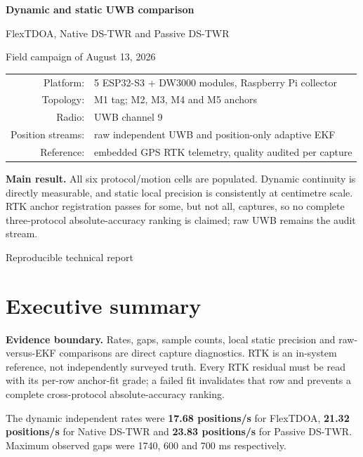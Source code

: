 \documentclass[10pt,a4paper]{article}
\begin{document}
\begin{titlepage}
\centering
\vspace*{18mm}
{\Huge\bfseries Dynamic and static UWB comparison\par}
\vspace{4mm}
{\Large FlexTDOA, Native DS-TWR and Passive DS-TWR\par}
\vspace{14mm}
{\large Field campaign of August 13, 2026\par}
\vspace{12mm}
\begin{tabular}{rl}
Platform: & 5 ESP32-S3 + DW3000 modules, Raspberry Pi collector\\
Topology: & M1 tag; M2, M3, M4 and M5 anchors\\
Radio: & UWB channel 9\\
Position streams: & raw independent UWB and position-only adaptive EKF\\
Reference: & embedded GPS RTK telemetry, quality audited per capture\\
\end{tabular}
\vfill
\colorbox{info}{\parbox{0.88\textwidth}{\vspace{2mm}
\textbf{Main result.} All six protocol/motion cells are populated. Dynamic
continuity is directly measurable, and static local precision is consistently
at centimetre scale. RTK anchor registration passes for some, but not all,
captures, so no complete three-protocol absolute-accuracy ranking is claimed;
raw UWB remains the audit stream.\vspace{2mm}}}
\vfill
{\large Reproducible technical report\par}
\end{titlepage}
\tableofcontents
\clearpage
{}

\section{Executive summary}
\colorbox{warning}{\parbox{0.96\textwidth}{\textbf{Evidence boundary.}
Rates, gaps, sample counts, local static precision and raw-versus-EKF
comparisons are direct capture diagnostics. RTK is an in-system reference, not
independently surveyed truth. Every RTK residual must be read with its per-row
anchor-fit grade; a failed fit invalidates that row and prevents a complete
cross-protocol absolute-accuracy ranking.}}

The dynamic independent rates were \textbf{17.68 positions/s}
for FlexTDOA, \textbf{21.32 positions/s} for Native
DS-TWR and \textbf{23.83 positions/s} for Passive
DS-TWR. Maximum observed gaps were 1740,
600 and 700 ms respectively.
\end{document}
